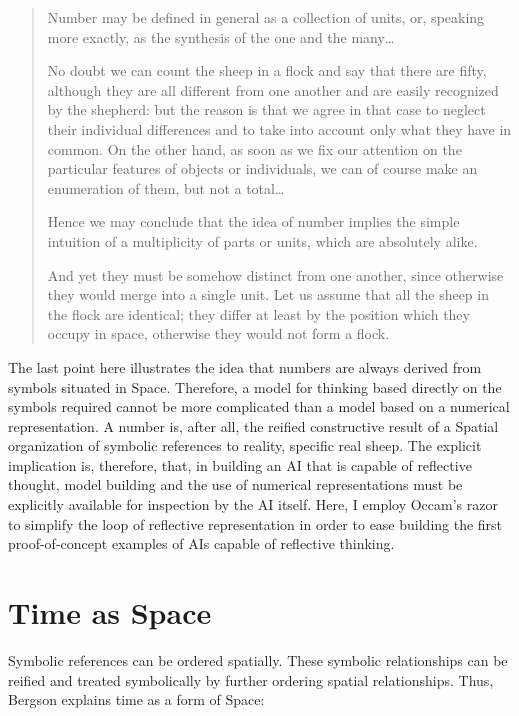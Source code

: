 \begin{quote}
Number may be defined in general as a collection of units, or,
speaking more exactly, as the synthesis of the one and the
many\ldots

No doubt we can count the sheep in a flock and say that there are
fifty, although they are all different from one another and are easily
recognized by the shepherd: but the reason is that we agree in that
case to neglect their individual differences and to take into account
only what they have in common.  On the other hand, as soon as we fix
our attention on the particular features of objects or individuals, we
can of course make an enumeration of them, but not a total\ldots

Hence we may conclude that the idea of number implies the simple
intuition of a multiplicity of parts or units, which are absolutely
alike.

And yet they must be somehow distinct from one another, since
otherwise they would merge into a single unit.  Let us assume that all
the sheep in the flock are identical; they differ at least by the
position which they occupy in space, otherwise they would not form a
flock.
\end{quote}

The last point here illustrates the idea that numbers are always
derived from symbols situated in Space.  Therefore, a model for
thinking based directly on the symbols required cannot be more
complicated than a model based on a numerical representation.  A
number is, after all, the reified constructive result of a Spatial
organization of symbolic references to reality, specific real sheep.
The explicit implication is, therefore, that, in building an AI that
is capable of reflective thought, model building and the use of
numerical representations must be explicitly available for inspection
by the AI itself.  Here, I employ Occam's razor to simplify the loop
of reflective representation in order to ease building the first
proof-of-concept examples of AIs capable of reflective thinking.

\section{Time as Space}

Symbolic references can be ordered spatially.  These symbolic
relationships can be reified and treated symbolically by further
ordering spatial relationships.  Thus, Bergson explains time as a form
of Space:

